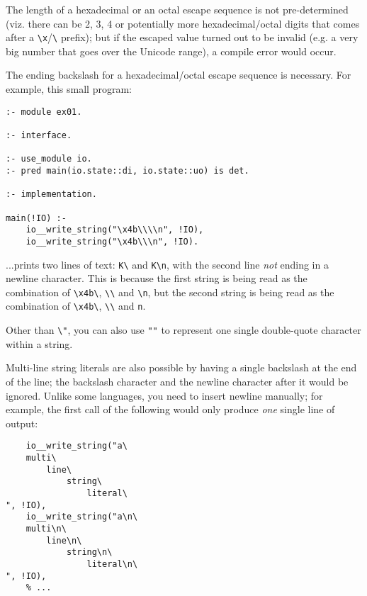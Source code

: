 The length of a hexadecimal or an octal escape sequence is not pre-determined (viz. there can be 2, 3, 4 or potentially more hexadecimal/octal digits that comes after a \texttt{\textbackslash x}/\texttt{\textbackslash} prefix); but if the escaped value turned out to be invalid (e.g. a very big number that goes over the Unicode range), a compile error would occur.

The ending backslash for a hexadecimal/octal escape sequence is necessary. For example, this small program:

\begin{lstlisting}[language=Mercury]
:- module ex01.

:- interface.

:- use_module io.
:- pred main(io.state::di, io.state::uo) is det.

:- implementation.

main(!IO) :-
	io__write_string("\x4b\\\\n", !IO),
	io__write_string("\x4b\\\n", !IO).
\end{lstlisting}

...prints two lines of text: \texttt{K\textbackslash} and \texttt{K\textbackslash n}, with the second line \textit{not} ending in a newline character. This is because the first string is being read as the combination of \texttt{\textbackslash x4b\textbackslash}, \texttt{\textbackslash\textbackslash} and \texttt{\textbackslash n}, but the second string is being read as the combination of \texttt{\textbackslash x4b\textbackslash}, \texttt{\textbackslash\textbackslash} and \texttt{n}.

Other than \texttt{\textbackslash "}, you can also use \texttt{""} to represent one single double-quote character within a string.

Multi-line string literals are also possible by having a single backslash at the end of the line; the backslash character and the newline character after it would be ignored. Unlike some languages, you need to insert newline manually; for example, the first call of the following would only produce \textit{one} single line of output:

\begin{lstlisting}[language=Mercury]
    % ...
	io__write_string("a\
    multi\
        line\
            string\
                literal\
", !IO),
	io__write_string("a\n\
    multi\n\
        line\n\
            string\n\
                literal\n\
", !IO),
    % ...
\end{lstlisting}


